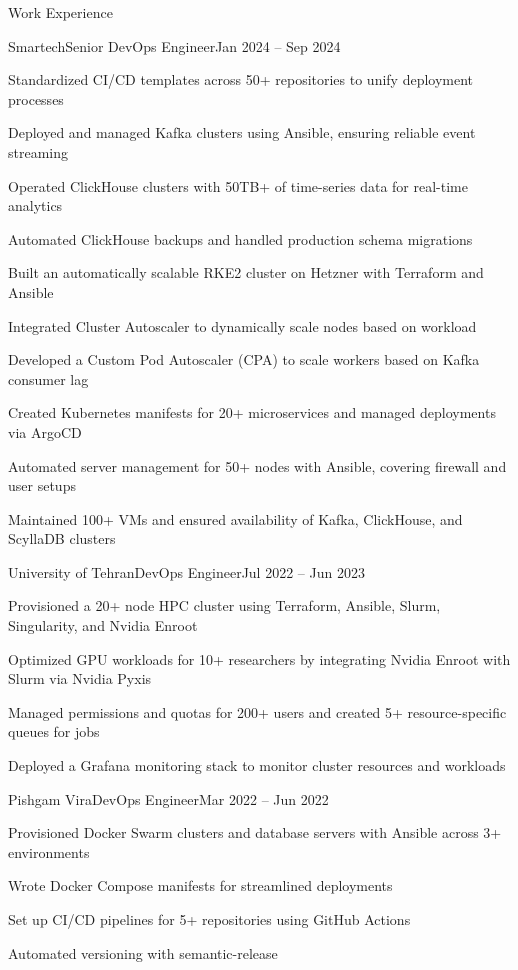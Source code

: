 \documentclass[]{main}
\begin{document}
\begin{section}{Work Experience}
 \begin{subsection}{Smartech}{Senior DevOps Engineer}{Jan 2024 -- Sep 2024}{}
     \item Standardized CI/CD templates across 50+ repositories to unify deployment processes
     \item Deployed and managed Kafka clusters using Ansible, ensuring reliable event streaming
     \item Operated ClickHouse clusters with 50TB+ of time-series data for real-time analytics
     \item Automated ClickHouse backups and handled production schema migrations
     \item Built an automatically scalable RKE2 cluster on Hetzner with Terraform and Ansible
     \item Integrated Cluster Autoscaler to dynamically scale nodes based on workload
     \item Developed a Custom Pod Autoscaler (CPA) to scale workers based on Kafka consumer lag
     \item Created Kubernetes manifests for 20+ microservices and managed deployments via ArgoCD
     \item Automated server management for 50+ nodes with Ansible, covering firewall and user setups
     \item Maintained 100+ VMs and ensured availability of Kafka, ClickHouse, and ScyllaDB clusters
 \end{subsection}

 \begin{subsection}{University of Tehran}{DevOps Engineer}{Jul 2022 -- Jun 2023}{}
     \item Provisioned a 20+ node HPC cluster using Terraform, Ansible, Slurm, Singularity, and Nvidia Enroot
     \item Optimized GPU workloads for 10+ researchers by integrating Nvidia Enroot with Slurm via Nvidia Pyxis
     \item Managed permissions and quotas for 200+ users and created 5+ resource-specific queues for jobs
     \item Deployed a Grafana monitoring stack to monitor cluster resources and workloads
 \end{subsection}

 \begin{subsection}{Pishgam Vira}{DevOps Engineer}{Mar 2022 -- Jun 2022}{}
     \item Provisioned Docker Swarm clusters and database servers with Ansible across 3+ environments
     \item Wrote Docker Compose manifests for streamlined deployments
     \item Set up CI/CD pipelines for 5+ repositories using GitHub Actions
     \item Automated versioning with semantic-release
 \end{subsection}


\end{section}
\end{document}
